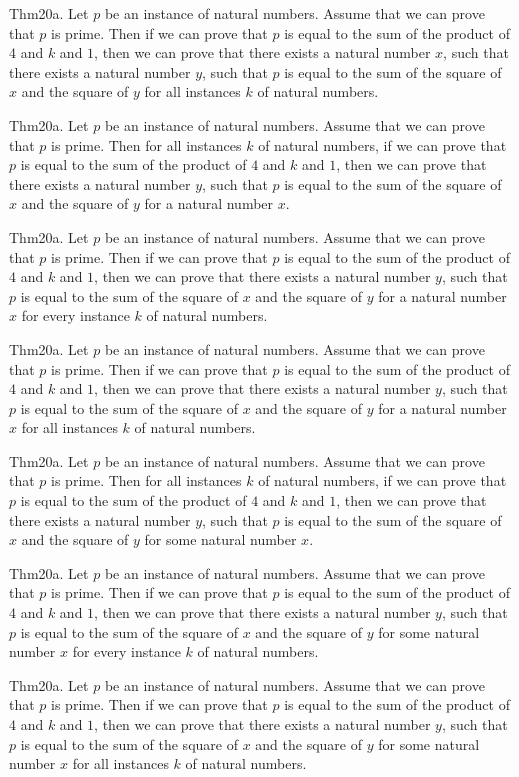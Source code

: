 \documentclass{article}
\begin{document}
Thm20a. Let $p$ be an instance of natural numbers. Assume that we can prove that $p$ is prime. Then if we can prove that $p$ is equal to the sum of the product of $4$ and $k$ and $1$, then we can prove that there exists a natural number $x$, such that there exists a natural number $y$, such that $p$ is equal to the sum of the square of $x$ and the square of $y$ for all instances $k$ of natural numbers.

Thm20a. Let $p$ be an instance of natural numbers. Assume that we can prove that $p$ is prime. Then for all instances $k$ of natural numbers, if we can prove that $p$ is equal to the sum of the product of $4$ and $k$ and $1$, then we can prove that there exists a natural number $y$, such that $p$ is equal to the sum of the square of $x$ and the square of $y$ for a natural number $x$.

Thm20a. Let $p$ be an instance of natural numbers. Assume that we can prove that $p$ is prime. Then if we can prove that $p$ is equal to the sum of the product of $4$ and $k$ and $1$, then we can prove that there exists a natural number $y$, such that $p$ is equal to the sum of the square of $x$ and the square of $y$ for a natural number $x$ for every instance $k$ of natural numbers.

Thm20a. Let $p$ be an instance of natural numbers. Assume that we can prove that $p$ is prime. Then if we can prove that $p$ is equal to the sum of the product of $4$ and $k$ and $1$, then we can prove that there exists a natural number $y$, such that $p$ is equal to the sum of the square of $x$ and the square of $y$ for a natural number $x$ for all instances $k$ of natural numbers.

Thm20a. Let $p$ be an instance of natural numbers. Assume that we can prove that $p$ is prime. Then for all instances $k$ of natural numbers, if we can prove that $p$ is equal to the sum of the product of $4$ and $k$ and $1$, then we can prove that there exists a natural number $y$, such that $p$ is equal to the sum of the square of $x$ and the square of $y$ for some natural number $x$.

Thm20a. Let $p$ be an instance of natural numbers. Assume that we can prove that $p$ is prime. Then if we can prove that $p$ is equal to the sum of the product of $4$ and $k$ and $1$, then we can prove that there exists a natural number $y$, such that $p$ is equal to the sum of the square of $x$ and the square of $y$ for some natural number $x$ for every instance $k$ of natural numbers.

Thm20a. Let $p$ be an instance of natural numbers. Assume that we can prove that $p$ is prime. Then if we can prove that $p$ is equal to the sum of the product of $4$ and $k$ and $1$, then we can prove that there exists a natural number $y$, such that $p$ is equal to the sum of the square of $x$ and the square of $y$ for some natural number $x$ for all instances $k$ of natural numbers.
\end{document}
